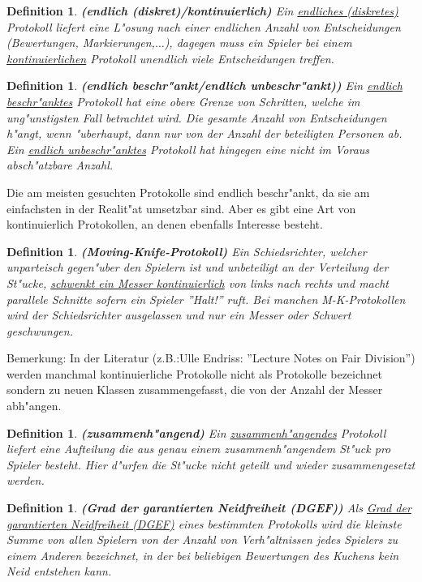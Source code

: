 \documentclass[11pt, a4paper, twoside]{article}
\newtheorem{defi}[satz]{Definition}
\numberwithin{equation}{section}
\begin{document}
\begin{defi}{\textbf{(endlich (diskret)/kontinuierlich)}}
\newline Ein \underline{endliches (diskretes)} Protokoll liefert eine L"osung nach einer endlichen Anzahl von Entscheidungen (Bewertungen, Markierungen,$\ldots$), dagegen muss ein Spieler bei einem \underline{kontinuierlichen} Protokoll unendlich viele Entscheidungen treffen.
\end{defi}
\begin{defi}{\textbf{(endlich beschr"ankt/endlich unbeschr"ankt))}}
\newline Ein \underline{endlich beschr"anktes} Protokoll hat eine obere Grenze von Schritten, welche im ung"unstigsten Fall betrachtet wird. Die gesamte Anzahl von Entscheidungen h"angt, wenn "uberhaupt, dann nur von der Anzahl der beteiligten Personen ab. Ein \underline{endlich unbeschr"anktes} Protokoll hat hingegen eine nicht im Voraus absch"atzbare Anzahl.
\end{defi}
Die am meisten gesuchten Protokolle sind endlich beschr"ankt, da sie am einfachsten in der Realit"at umsetzbar sind. Aber es gibt eine Art von kontinuierlich Protokollen, an denen ebenfalls Interesse besteht.
\begin{defi}{\textbf{(Moving-Knife-Protokoll)}}
\newline Ein Schiedsrichter, welcher unparteisch gegen"uber den Spielern ist und unbeteiligt an der Verteilung der St"ucke, \underline{schwenkt ein Messer kontinuierlich} von links nach rechts und macht parallele Schnitte sofern ein Spieler ''Halt!'' ruft. Bei manchen M-K-Protokollen wird der Schiedsrichter ausgelassen und nur ein Messer oder Schwert geschwungen.
\end{defi}
Bemerkung: In der Literatur (z.B.:Ulle Endriss:\cite{10} ''Lecture Notes on Fair Division'') werden manchmal kontinuierliche Protokolle nicht als Protokolle bezeichnet sondern zu neuen Klassen zusammengefasst, die von der Anzahl der Messer abh"angen. 
\begin{defi}{\textbf{(zusammenh"angend)}}
\newline Ein \underline{zusammenh"angendes} Protokoll liefert eine Aufteilung die aus genau einem zusammenh"angendem St"uck pro Spieler besteht. Hier d"urfen die St"ucke nicht geteilt und wieder zusammengesetzt werden.
\end{defi}
\begin{defi}{\textbf{(Grad der garantierten Neidfreiheit (DGEF))}}
\newline Als \underline{Grad der garantierten Neidfreiheit (DGEF)} eines bestimmten Protokolls wird die kleinste Summe von allen Spielern von der Anzahl von Verh"altnissen jedes Spielers zu einem Anderen bezeichnet, in der bei beliebigen Bewertungen des Kuchens kein Neid entstehen kann.\end{defi} 
\end{document}
